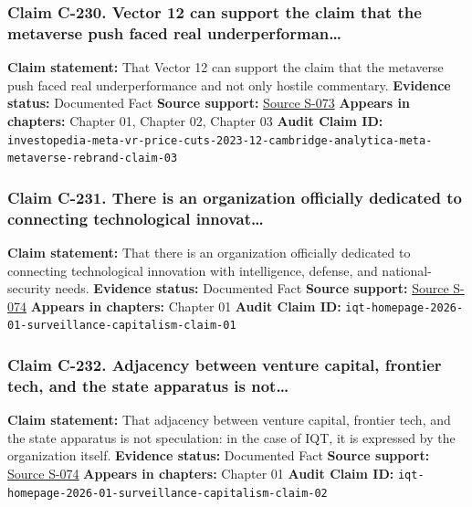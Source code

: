 \documentclass[
  american,
  11pt,
  letterpaper,
]{article}
\begin{document}
\subsubsection{Claim C-230. Vector 12 can support the claim that the
metaverse push faced real
underperforman\ldots{}}\label{claim-c-230-vector-12-can-support-the-claim-that-the-metaverse-push-faced-real-underperforman}

\textbf{Claim statement:} That Vector 12 can support the claim that the
metaverse push faced real underperformance and not only hostile
commentary. \textbf{Evidence status:} Documented Fact \textbf{Source
support:}
\hyperref[source-s-073-meta-slashes-prices-for-vr-headsets]{Source
S-073} \textbf{Appears in chapters:} Chapter 01, Chapter 02, Chapter 03
\textbf{Audit Claim ID:}
\texttt{investopedia-meta-vr-price-cuts-2023-12-cambridge-analytica-meta-metaverse-rebrand-claim-03}

\subsubsection{Claim C-231. There is an organization officially
dedicated to connecting technological
innovat\ldots{}}\label{claim-c-231-there-is-an-organization-officially-dedicated-to-connecting-technological-innovat}

\textbf{Claim statement:} That there is an organization officially
dedicated to connecting technological innovation with intelligence,
defense, and national-security needs. \textbf{Evidence status:}
Documented Fact \textbf{Source support:}
\hyperref[source-s-074-in-q-tel]{Source S-074} \textbf{Appears in
chapters:} Chapter 01 \textbf{Audit Claim ID:}
\texttt{iqt-homepage-2026-01-surveillance-capitalism-claim-01}

\subsubsection{Claim C-232. Adjacency between venture capital, frontier
tech, and the state apparatus is
not\ldots{}}\label{claim-c-232-adjacency-between-venture-capital-frontier-tech-and-the-state-apparatus-is-not}

\textbf{Claim statement:} That adjacency between venture capital,
frontier tech, and the state apparatus is not speculation: in the case
of IQT, it is expressed by the organization itself. \textbf{Evidence
status:} Documented Fact \textbf{Source support:}
\hyperref[source-s-074-in-q-tel]{Source S-074} \textbf{Appears in
chapters:} Chapter 01 \textbf{Audit Claim ID:}
\texttt{iqt-homepage-2026-01-surveillance-capitalism-claim-02}
\end{document}
